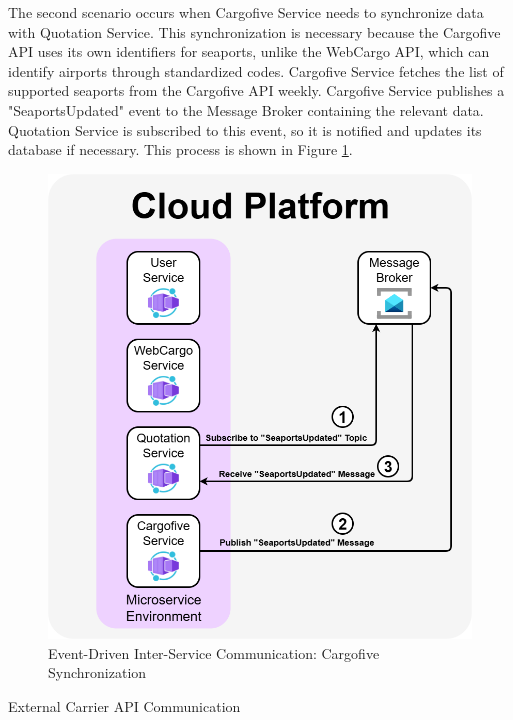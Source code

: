 \documentclass[12pt, reqno, oneside]{amsbook}
\makeatletter
\def\subsection{\@startsection{subsection}{2}%
      \z@{.5\linespacing\@plus.7\linespacing}{.25\linespacing}%
      {\normalfont\bfseries\flushleft}}
\theoremstyle{definition}
\theoremstyle{definition}
\numberwithin{section}{chapter}
\numberwithin{table}{chapter}
\numberwithin{figure}{chapter}
\makeatother
\begin{document}
\pagebreak

The second scenario occurs when Cargofive Service needs to synchronize data with Quotation Service. This synchronization is necessary because the Cargofive \Ac{API} uses its own identifiers for seaports, unlike the WebCargo \ac{API}, which can identify airports through standardized codes. Cargofive Service fetches the list of supported seaports from the Cargofive \ac{API} weekly. Cargofive Service publishes a "SeaportsUpdated" event to the Message Broker containing the relevant data. Quotation Service is subscribed to this event, so it is notified and updates its database if necessary. This process is shown in Figure \ref{Figure:EventDrivenCommunicationCargofive}.

\begin{figure}[H]
  \centering
  \includegraphics[width=0.9\linewidth]{images/EventDrivenCommunicationCargofive.png}
  \caption{\label{Figure:EventDrivenCommunicationCargofive}Event-Driven Inter-Service Communication: Cargofive Synchronization}
\end{figure}

\pagebreak

\subsection{External Carrier API Communication}
\label{Subsection:External_Carrier_API_Communication}
\end{document}
